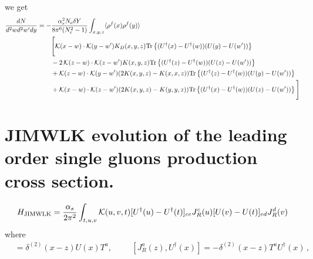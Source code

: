 \documentclass[aps,prd,amsmath,amssymb,nofootinbib]{revtex4-2}
\numberwithin{equation}{section}
\begin{document}
we get 
\begin{align}
\label{Eq:LOBFKL}
    \frac{dN}{d^2 w d^2 w' dy}= - &\frac{\alpha_{s}^2 N_c  \delta Y }{8\pi^{6} (N_c^2-1)}
    \int_{x,y,z} \langle \rho^f(x) \rho^f(y)\rangle 
    \notag \\ &
    \Bigg[
    {\cal K} (x-w) \cdot {\cal K} (y-w') K_D(x,y,z) {\rm Tr} \left \{  (U^\dagger(x)-U^\dagger(w)) (U(y)-U(w')) \right\}
    \notag \\ &
    -2\, {\cal K} (z-w) \cdot {\cal K} (z-w') K(x,y,z) {\rm Tr} \left \{  (U^\dagger(z)-U^\dagger(w)) (U(z)-U(w')) \right\}
    \notag \\ &
    +
    {\cal K} (z-w) \cdot {\cal K} (y-w') (2K(x,y,z) - K(x,x,z)) {\rm Tr} \left \{  (U^\dagger(z)-U^\dagger(w)) (U(y)-U(w')) \right\}
    \notag \\ &
    +
    {\cal K} (x-w) \cdot {\cal K} (z-w') (2K(x,y,z) - K(y,y,z)) {\rm Tr} \left \{  (U^\dagger(x)-U^\dagger(w)) (U(z)-U(w')) \right\}
    \Bigg]
\end{align}





\section{JIMWLK evolution of the leading order single gluons production cross section.}


\begin{equation}
\label{Eq:HLO}
H_{\text{JIMWLK}}= \frac{\alpha_s}{2 \pi^2} \int_{t,u,v} 
{\cal K}(u, v, t)
[U^\dagger(u)  - U^\dagger(t)]_{ce} J_R ^c(u)    [U(v)  - U(t)  ]_{ed} J_R ^d(v)
\end{equation}
where 
 \begin{align}
    [J_{R}^a (z), U(x)] &= \delta^{(2)}(x-z) U(x)T^a,  \hspace{1cm}    [J_{R}^a (z) ,U^\dagger(x)] =- \delta^{(2)}(x-z) T^a U^\dagger(x)\,,
\end{align}
\end{document}
